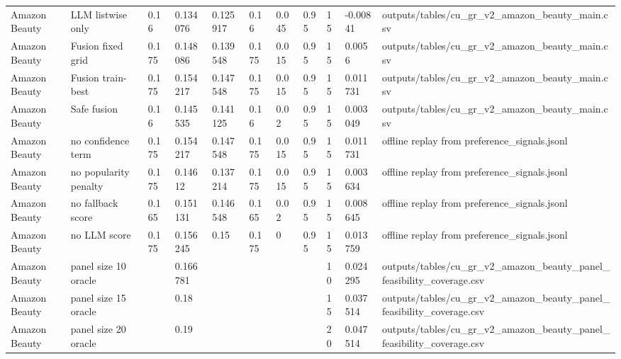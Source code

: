 \begin{tabular}{lllllllllll}
Amazon Beauty & LLM listwise only & 0.16 & 0.134076 & 0.125917 & 0.16 & 0.045 & 0.95 & 15 & -0.00841 & outputs/tables/cu\_gr\_v2\_amazon\_beauty\_main.csv \\
Amazon Beauty & Fusion fixed grid & 0.175 & 0.148086 & 0.139548 & 0.175 & 0.015 & 0.95 & 15 & 0.0056 & outputs/tables/cu\_gr\_v2\_amazon\_beauty\_main.csv \\
Amazon Beauty & Fusion train-best & 0.175 & 0.154217 & 0.147548 & 0.175 & 0.015 & 0.95 & 15 & 0.011731 & outputs/tables/cu\_gr\_v2\_amazon\_beauty\_main.csv \\
Amazon Beauty & Safe fusion & 0.16 & 0.145535 & 0.141125 & 0.16 & 0.02 & 0.95 & 15 & 0.003049 & outputs/tables/cu\_gr\_v2\_amazon\_beauty\_main.csv \\
Amazon Beauty & no confidence term & 0.175 & 0.154217 & 0.147548 & 0.175 & 0.015 & 0.95 & 15 & 0.011731 & offline replay from preference\_signals.jsonl \\
Amazon Beauty & no popularity penalty & 0.175 & 0.14612 & 0.137214 & 0.175 & 0.015 & 0.95 & 15 & 0.003634 & offline replay from preference\_signals.jsonl \\
Amazon Beauty & no fallback score & 0.165 & 0.151131 & 0.146548 & 0.165 & 0.02 & 0.95 & 15 & 0.008645 & offline replay from preference\_signals.jsonl \\
Amazon Beauty & no LLM score & 0.175 & 0.156245 & 0.15 & 0.175 & 0 & 0.95 & 15 & 0.013759 & offline replay from preference\_signals.jsonl \\
Amazon Beauty & panel size 10 oracle &  & 0.166781 &  &  &  &  & 10 & 0.024295 & outputs/tables/cu\_gr\_v2\_amazon\_beauty\_panel\_feasibility\_coverage.csv \\
Amazon Beauty & panel size 15 oracle &  & 0.18 &  &  &  &  & 15 & 0.037514 & outputs/tables/cu\_gr\_v2\_amazon\_beauty\_panel\_feasibility\_coverage.csv \\
Amazon Beauty & panel size 20 oracle &  & 0.19 &  &  &  &  & 20 & 0.047514 & outputs/tables/cu\_gr\_v2\_amazon\_beauty\_panel\_feasibility\_coverage.csv \\
\bottomrule
\end{tabular}
